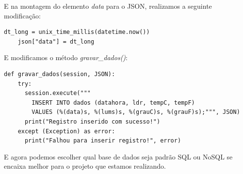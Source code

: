 \documentclass[a4paper,11pt]{article}
\begin{document}
E na montagem do elemento \textit{data} para o JSON, realizamos a seguinte modificação:
\begin{lstlisting}[]
	dt_long = unix_time_millis(datetime.now())
	json["data"] = dt_long
\end{lstlisting}

E modificamos o método \textit{gravar\_dados()}:
\begin{lstlisting}[]
  def gravar_dados(session, JSON):
    try:
      session.execute("""
        INSERT INTO dados (datahora, ldr, tempC, tempF)
        VALUES (%(data)s, %(lums)s, %(grauC)s, %(grauF)s);""", JSON)
      print("Registro inserido com sucesso!")
    except (Exception) as error:
      print("Falhou para inserir registro!", error)
\end{lstlisting}

E agora podemos escolher qual base de dados seja padrão SQL ou NoSQL se encaixa melhor para o projeto que estamos realizando.
\end{document}
